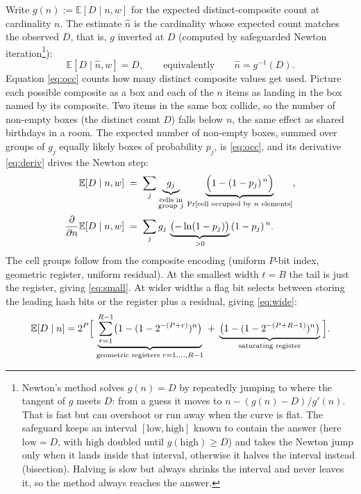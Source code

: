 \medskip
\noindent Write $g(n):=\mathbb{E}[D\mid n,w]$ for the expected distinct-composite count at cardinality $n$. The estimate $\hat{n}$ is the cardinality whose expected count matches the observed $D$, that is, $g$ inverted at $D$ (computed by safeguarded Newton iteration\footnote{Newton's method solves $g(n)=D$ by repeatedly jumping to where the tangent of $g$ meets $D$: from a guess it moves to $n-(g(n)-D)/g'(n)$. That is fast but can overshoot or run away when the curve is flat. The safeguard keeps an interval $[\mathrm{low},\mathrm{high}]$ known to contain the answer (here $\mathrm{low}=D$, with $\mathrm{high}$ doubled until $g(\mathrm{high})\ge D$) and takes the Newton jump only when it lands inside that interval, otherwise it halves the interval instead (bisection). Halving is slow but always shrinks the interval and never leaves it, so the method always reaches the answer.}):
\begin{equation}\label{eq:est}
\mathbb{E}[D\mid \hat{n},w]=D,
\qquad\text{equivalently}\qquad
\hat{n}=g^{-1}(D).
\end{equation}
Equation \eqref{eq:occ} counts how many distinct composite values get used. Picture each possible composite as a box and each of the $n$ items as landing in the box named by its composite. Two items in the same box collide, so the number of non-empty boxes (the distinct count $D$) falls below $n$, the same effect as shared birthdays in a room. The expected number of non-empty boxes, summed over groups of $g_j$ equally likely boxes of probability $p_j$, is \eqref{eq:occ}, and its derivative \eqref{eq:deriv} drives the Newton step:
\begin{align}
\mathbb{E}[D\mid n,w]&\;=\;\sum_{j} \underbrace{g_j}_{\substack{\text{cells in}\\\text{group }j}}\,\underbrace{\Bigl(1-(1-p_j)^{\,n}\Bigr)}_{\Pr[\text{cell occupied by }n\text{ elements}]}, \label{eq:occ}\\[2pt]
\frac{\partial}{\partial n}\mathbb{E}[D\mid n,w]&\;=\;\sum_{j} g_j\,\underbrace{\bigl(-\ln(1-p_j)\bigr)}_{>0}\,(1-p_j)^{\,n}. \label{eq:deriv}
\end{align}
The cell groups follow from the composite encoding (uniform $P$-bit index, geometric register, uniform residual). At the smallest width $t=B$ the tail is just the register, giving \eqref{eq:small}. At wider widths a flag bit selects between storing the leading hash bits or the register plus a residual, giving \eqref{eq:wide}:
\begin{equation}\label{eq:small}
\mathbb{E}[D\mid n]
=2^{P}\Bigl[\;
\underbrace{\sum_{r=1}^{R-1}\bigl(1-(1-2^{-(P+r)})^{n}\bigr)}_{\text{geometric registers }r=1,\dots,R-1}
\;+\;
\underbrace{\bigl(1-(1-2^{-(P+R-1)})^{n}\bigr)}_{\text{saturating register}}
\;\Bigr].
\end{equation}
